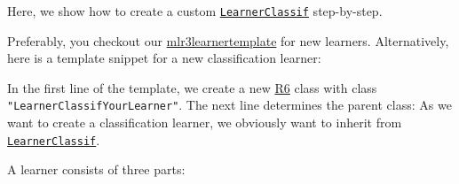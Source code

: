 \documentclass[]{scrbook}
\newenvironment{Shaded}{\begin{snugshade}}{\end{snugshade}}
\newcommand{\ControlFlowTok}[1]{\textcolor[rgb]{0.13,0.29,0.53}{\textbf{#1}}}
\newcommand{\DataTypeTok}[1]{\textcolor[rgb]{0.13,0.29,0.53}{#1}}
\newcommand{\KeywordTok}[1]{\textcolor[rgb]{0.13,0.29,0.53}{\textbf{#1}}}
\newcommand{\NormalTok}[1]{#1}
\newcommand{\OperatorTok}[1]{\textcolor[rgb]{0.81,0.36,0.00}{\textbf{#1}}}
\newcommand{\StringTok}[1]{\textcolor[rgb]{0.31,0.60,0.02}{#1}}
\renewenvironment{Shaded} {\begin{snugshade}\small} {\end{snugshade}}
\begin{document}
Here, we show how to create a custom \href{https://mlr3.mlr-org.com/reference/LearnerClassif.html}{\texttt{LearnerClassif}} step-by-step.

Preferably, you checkout our \href{https://github.com/mlr-org/mlr3learnertemplate}{mlr3learnertemplate} for new learners.
Alternatively, here is a template snippet for a new classification learner:

\begin{Shaded}
\end{Shaded}

In the first line of the template, we create a new \href{https://cran.r-project.org/package=R6}{R6} class with class \texttt{"LearnerClassifYourLearner"}.
The next line determines the parent class:
As we want to create a classification learner, we obviously want to inherit from \href{https://mlr3.mlr-org.com/reference/LearnerClassif.html}{\texttt{LearnerClassif}}.

A learner consists of three parts:
\end{document}

